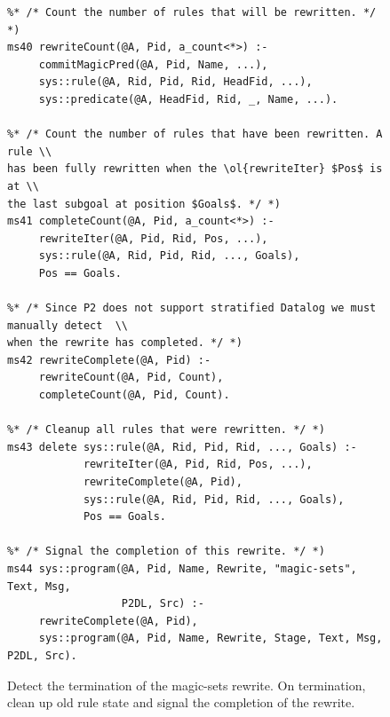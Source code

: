 \begin{figure}
\ssp
\centering
\begin{lstlisting}
%* /* Count the number of rules that will be rewritten. */ *)
ms40 rewriteCount(@A, Pid, a_count<*>) :-
     commitMagicPred(@A, Pid, Name, ...),
     sys::rule(@A, Rid, Pid, Rid, HeadFid, ...),
     sys::predicate(@A, HeadFid, Rid, _, Name, ...).
	
%* /* Count the number of rules that have been rewritten. A rule \\ 
has been fully rewritten when the \ol{rewriteIter} $Pos$ is at \\
the last subgoal at position $Goals$. */ *)
ms41 completeCount(@A, Pid, a_count<*>) :-
     rewriteIter(@A, Pid, Rid, Pos, ...),
     sys::rule(@A, Rid, Pid, Rid, ..., Goals),
     Pos == Goals.
	
%* /* Since P2 does not support stratified Datalog we must manually detect  \\
when the rewrite has completed. */ *)
ms42 rewriteComplete(@A, Pid) :- 
     rewriteCount(@A, Pid, Count),
     completeCount(@A, Pid, Count).

%* /* Cleanup all rules that were rewritten. */ *)
ms43 delete sys::rule(@A, Rid, Pid, Rid, ..., Goals) :-
            rewriteIter(@A, Pid, Rid, Pos, ...),
            rewriteComplete(@A, Pid),
            sys::rule(@A, Rid, Pid, Rid, ..., Goals),
            Pos == Goals.

%* /* Signal the completion of this rewrite. */ *)
ms44 sys::program(@A, Pid, Name, Rewrite, "magic-sets", Text, Msg, 
                  P2DL, Src) :-
     rewriteComplete(@A, Pid),
     sys::program(@A, Pid, Name, Rewrite, Stage, Text, Msg, P2DL, Src).

\end{lstlisting}
\caption{\label{ch:magic:fig:rewrite10} Detect the termination of the magic-sets rewrite. 
On termination, clean up old rule state and signal the completion of the rewrite.}
\end{figure}

